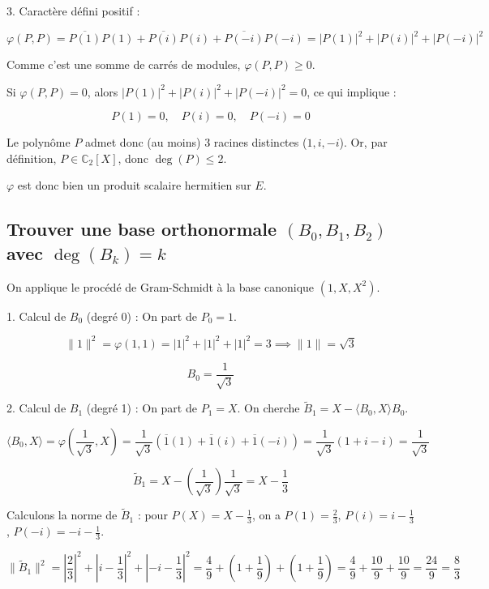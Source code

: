 \documentclass[french]{yLectureNote}
\begin{document}
3. Caractère défini positif :

$$\varphi(P,P) = \overline{P(1)}P(1) + \overline{P(i)}P(i) + \overline{P(-i)}P(-i) = |P(1)|^2 + |P(i)|^2 + |P(-i)|^2$$

Comme c'est une somme de carrés de modules, $\varphi(P,P) \ge 0$.

Si $\varphi(P,P) = 0$, alors $|P(1)|^2 + |P(i)|^2 + |P(-i)|^2 = 0$, ce qui implique :


$$P(1) = 0, \quad P(i) = 0, \quad P(-i) = 0$$


Le polynôme $P$ admet donc (au moins) 3 racines distinctes ($1, i, -i$). Or, par définition, $P \in \mathbb{C}_2[X]$, donc $\deg(P) \le 2$.


$\varphi$ est donc bien un produit scalaire hermitien sur $E$.

\subsection{Trouver une base orthonormale $(B_0, B_1, B_2)$ avec $\deg(B_k) = k$}

On applique le procédé de Gram-Schmidt à la base canonique $(1, X, X^2)$.

1. Calcul de $B_0$ (degré 0) :
On part de $P_0 = 1$.

$$\|1\|^2 = \varphi(1,1) = |1|^2 + |1|^2 + |1|^2 = 3 \implies \|1\| = \sqrt{3}$$


$$B_0 = \frac{1}{\sqrt{3}}$$


2. Calcul de $B_1$ (degré 1) :
On part de $P_1 = X$. On cherche $\tilde{B}_1 = X - \langle B_0, X \rangle B_0$.

$$\langle B_0, X \rangle = \varphi\left(\frac{1}{\sqrt{3}}, X\right) = \frac{1}{\sqrt{3}}\left(\overline{1}(1) + \overline{1}(i) + \overline{1}(-i)\right) = \frac{1}{\sqrt{3}}(1 + i - i) = \frac{1}{\sqrt{3}}$$


$$\tilde{B}_1 = X - \left(\frac{1}{\sqrt{3}}\right)\frac{1}{\sqrt{3}} = X - \frac{1}{3}$$



Calculons la norme de $\tilde{B}_1$ : pour $P(X) = X - \frac{1}{3}$, on a $P(1)=\frac{2}{3}$, $P(i)=i-\frac{1}{3}$, $P(-i)=-i-\frac{1}{3}$.

$$\|\tilde{B}_1\|^2 = \left|\frac{2}{3}\right|^2 + \left|i-\frac{1}{3}\right|^2 + \left|-i-\frac{1}{3}\right|^2 = \frac{4}{9} + \left(1 + \frac{1}{9}\right) + \left(1 + \frac{1}{9}\right) = \frac{4}{9} + \frac{10}{9} + \frac{10}{9} = \frac{24}{9} = \frac{8}{3}$$
\end{document}
